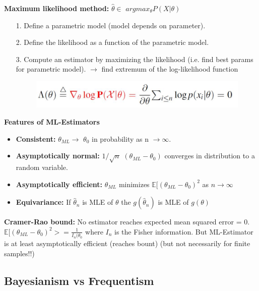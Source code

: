 \textbf{Maximum likelihood method: }\quad $\hat{\theta} \in$ $argmax_{\theta} P(X|\theta)$
\begin{itemize}
    \item[1.] Define a parametric model (model depends on parameter).
    \item[2.] Define the likelihood as a function of the parametric model.
    \item[3.] Compute an estimator by maximizing the likelihood (i.e. find best params for parametric model).
    $\rightarrow$ find extremum of the log-likelihood function
    
\begin{figure}[h!]
    \centering
    \includegraphics[scale=1]{Figures/ML-Estimator.JPG}
    \label{fig:ML-estimator}
    \end{figure}
\end{itemize}

\textbf{Features of ML-Estimators}
\begin{itemize}
    \item\textbf{Consistent: }$\theta_{ML} \rightarrow$ $\theta_{0}$ in probability as n $\rightarrow \infty$.
    \item\textbf{Asymptotically normal: }$1/\sqrt{n}$ $(\theta_{ML} - \theta_0)$ converges in distribution to a random variable.
    \item\textbf{Asymptotically efficient: }$\theta_{ML}$ minimizes $\mathbb{E}[(\theta_{ML} - \theta_0)^2$ as $n \rightarrow \infty$
    \item\textbf{Equivariance: }If $\hat\theta_n$ is MLE of $\theta$ the $g(\hat\theta_n)$ is MLE of $g(\theta)$
\end{itemize}

\textbf{Cramer-Rao bound: } No estimator reaches expected mean squared error = 0.\\
\quad $\mathbb{E}[(\theta_{ML} - \theta_0)^2 >= \frac{1}{I_n(\theta_0}$ where $I_n$ is the Fisher information. But ML-Estimator is at least asymptotically efficient (reaches bount) (but not necessarily for finite samples!!)

\subsection{Bayesianism vs Frequentism}

